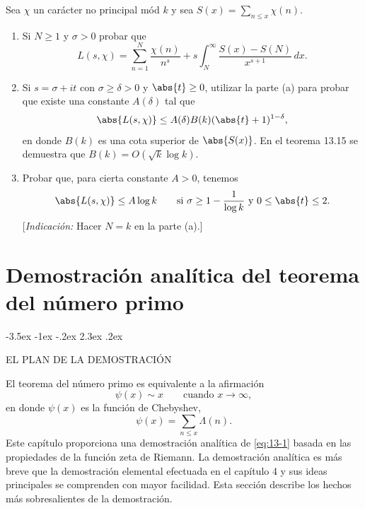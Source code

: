 \documentclass[12pt,a4paper]{book}
\makeatletter
\renewcommand\section{\@startsection{section}{1}{\z@}%
  {-3.5ex \@plus -1ex \@minus -.2ex}%
  {2.3ex \@plus .2ex}%
  {\normalfont\Large\bfseries\raggedright}}
\makeatother
\begin{document}
    \begin{ejercicio}
        Sea $\chi$ un carácter no principal mód $k$ y sea $S(x)=\sum_{n\leq x}\chi(n)$.
        \begin{enumerate}
            \item[(a)] Si $N\geq1$ y $\sigma>0$ probar que
            \begin{equation*}
                L(s,\chi)=\sum_{n=1}^{N}\frac{\chi(n)}{n^{s}}+s\int_{N}^{\infty}\frac{S(x)-S(N)}{x^{s+1}}\,dx.
            \end{equation*}
            \item[(b)] Si $s=\sigma+it$ con $\sigma\geq\delta>0$ y $\abs{t}\geq0$, utilizar la
            parte (a) para probar que existe una constante $A(\delta)$ tal que
            \begin{equation*}
                \abs{L(s,\chi)}\leq A(\delta)B(k)(\abs{t}+1)^{1-\delta},
            \end{equation*}
            en donde $B(k)$ es una cota superior de $\abs{S(x)}$. En el teorema 13.15 se
            demuestra que $B(k)=O(\sqrt{k}\log k)$.
            \item[(c)] Probar que, para cierta constante $A>0$, tenemos
            \begin{equation*}
                \abs{L(s,\chi)}\leq A\log k\qquad\text{si }\sigma\geq1-\frac{1}{\log k}\text{ y }0\leq\abs{t}\leq2.
            \end{equation*}
            [\textit{Indicación:} Hacer $N=k$ en la parte (a).]
        \end{enumerate}
    \end{ejercicio}

\chapter{Demostración analítica del teorema del número primo}

    \section{EL PLAN DE LA DEMOSTRACIÓN}

    El teorema del número primo es equivalente a la afirmación
    \begin{equation}\label{eq:13-1}
        \psi(x)\sim x\qquad\text{cuando }x\to\infty,
    \end{equation}
    en donde $\psi(x)$ es la función de Chebyshev,
    \begin{equation*}
        \psi(x)=\sum_{n\leq x}\Lambda(n).
    \end{equation*}
    Este capítulo proporciona una demostración analítica de \eqref{eq:13-1} basada en las
    propiedades de la función zeta de Riemann. La demostración analítica es más breve que la
    demostración elemental efectuada en el capítulo 4 y sus ideas principales se comprenden
    con mayor facilidad. Esta sección describe los hechos más sobresalientes de la
    demostración.
\end{document}
